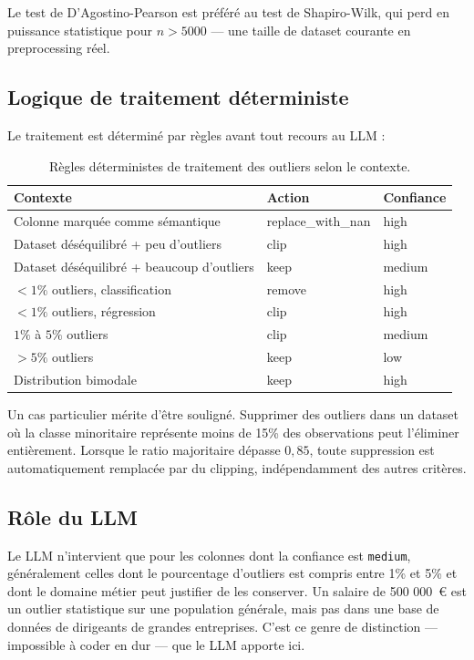 \documentclass[12pt,a4paper]{article}
\begin{document}
Le test de D'Agostino-Pearson est préféré au test de Shapiro-Wilk, qui perd en puissance
statistique pour $n > 5000$ --- une taille de dataset courante en preprocessing réel.

\subsection{Logique de traitement déterministe}

Le traitement est déterminé par règles avant tout recours au LLM :

\begin{table}[H]
\centering
\begin{tabular}{p{4.5cm}ll}
\toprule
\textbf{Contexte} & \textbf{Action} & \textbf{Confiance} \\
\midrule
Colonne marquée comme sémantique & replace\_with\_nan & high \\
Dataset déséquilibré + peu d'outliers & clip & high \\
Dataset déséquilibré + beaucoup d'outliers & keep & medium \\
$< 1\%$ outliers, classification & remove & high \\
$< 1\%$ outliers, régression & clip & high \\
$1\%$ à $5\%$ outliers & clip & medium \\
$> 5\%$ outliers & keep & low \\
Distribution bimodale & keep & high \\
\bottomrule
\end{tabular}
\caption{Règles déterministes de traitement des outliers selon le contexte.}
\end{table}

Un cas particulier mérite d'être souligné. Supprimer des outliers dans un dataset où
la classe minoritaire représente moins de 15\% des observations peut l'éliminer
entièrement. Lorsque le ratio majoritaire dépasse $0{,}85$, toute suppression est
automatiquement remplacée par du clipping, indépendamment des autres critères.

\subsection{Rôle du LLM}

Le LLM n'intervient que pour les colonnes dont la confiance est \texttt{medium},
généralement celles dont le pourcentage d'outliers est compris entre 1\% et 5\% et
dont le domaine métier peut justifier de les conserver. Un salaire de 500 000~\euro{}
est un outlier statistique sur une population générale, mais pas dans une base de
données de dirigeants de grandes entreprises. C'est ce genre de distinction ---
impossible à coder en dur --- que le LLM apporte ici.
\end{document}
